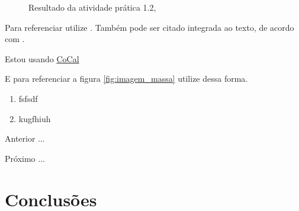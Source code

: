 



\begin{figure}[H] %
  \center
  \caption{Resultado da atividade prática 1.2, \cite{oliveira_SO2009}}\label{fig:ap1_cod_vigual1}
\end{figure}



Para referenciar utilize \cite{ninguem2022curioso}. Também pode ser citado integrada ao texto, de acordo com .


\par Estou usando \href {https://cocalc.com/} {CoCal}

E para referenciar a figura \ref{fig:imagem_massa} utilize dessa forma.


\begin{enumerate}[label=\Roman{*}, ref=(\roman{*})]
  \item fsfsdf
  \item kugfhiuh
\end{enumerate}

\begin{asparaenum}
\item Anterior ... \cite{ninguem2022curioso}
\item Próximo ... \label{pl1}
\end{asparaenum}



\section{Conclusões}




